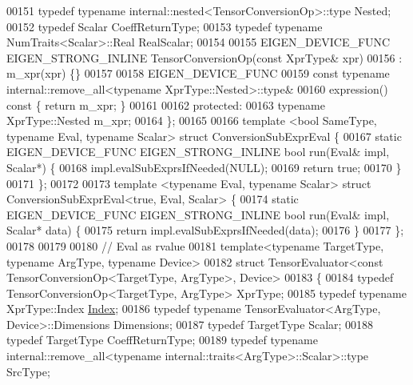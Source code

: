 \begin{DoxyCode}
00151     \textcolor{keyword}{typedef} \textcolor{keyword}{typename} internal::nested<TensorConversionOp>::type Nested;
00152     \textcolor{keyword}{typedef} Scalar CoeffReturnType;
00153     \textcolor{keyword}{typedef} \textcolor{keyword}{typename} NumTraits<Scalar>::Real RealScalar;
00154 
00155     EIGEN\_DEVICE\_FUNC EIGEN\_STRONG\_INLINE TensorConversionOp(\textcolor{keyword}{const} XprType& xpr)
00156         : m\_xpr(xpr) \{\}
00157 
00158     EIGEN\_DEVICE\_FUNC
00159     \textcolor{keyword}{const} \textcolor{keyword}{typename} internal::remove\_all<typename XprType::Nested>::type&
00160     expression()\textcolor{keyword}{ const }\{ \textcolor{keywordflow}{return} m\_xpr; \}
00161 
00162   \textcolor{keyword}{protected}:
00163     \textcolor{keyword}{typename} XprType::Nested m\_xpr;
00164 \};
00165 
00166 \textcolor{keyword}{template} <\textcolor{keywordtype}{bool} SameType, \textcolor{keyword}{typename} Eval, \textcolor{keyword}{typename} Scalar> \textcolor{keyword}{struct }ConversionSubExprEval \{
00167   \textcolor{keyword}{static} EIGEN\_DEVICE\_FUNC EIGEN\_STRONG\_INLINE \textcolor{keywordtype}{bool} run(Eval& impl, Scalar*) \{
00168     impl.evalSubExprsIfNeeded(NULL);
00169     \textcolor{keywordflow}{return} \textcolor{keyword}{true};
00170   \}
00171 \};
00172 
00173 \textcolor{keyword}{template} <\textcolor{keyword}{typename} Eval, \textcolor{keyword}{typename} Scalar> \textcolor{keyword}{struct }ConversionSubExprEval<true, Eval, Scalar> \{
00174   \textcolor{keyword}{static} EIGEN\_DEVICE\_FUNC EIGEN\_STRONG\_INLINE \textcolor{keywordtype}{bool} run(Eval& impl, Scalar* data) \{
00175     \textcolor{keywordflow}{return} impl.evalSubExprsIfNeeded(data);
00176   \}
00177 \};
00178 
00179 
00180 \textcolor{comment}{// Eval as rvalue}
00181 \textcolor{keyword}{template}<\textcolor{keyword}{typename} TargetType, \textcolor{keyword}{typename} ArgType, \textcolor{keyword}{typename} Device>
00182 \textcolor{keyword}{struct }TensorEvaluator<const TensorConversionOp<TargetType, ArgType>, Device>
00183 \{
00184   \textcolor{keyword}{typedef} TensorConversionOp<TargetType, ArgType> XprType;
00185   \textcolor{keyword}{typedef} \textcolor{keyword}{typename} XprType::Index \hyperlink{namespace_eigen_a62e77e0933482dafde8fe197d9a2cfde}{Index};
00186   \textcolor{keyword}{typedef} \textcolor{keyword}{typename} TensorEvaluator<ArgType, Device>::Dimensions Dimensions;
00187   \textcolor{keyword}{typedef} TargetType Scalar;
00188   \textcolor{keyword}{typedef} TargetType CoeffReturnType;
00189   \textcolor{keyword}{typedef} \textcolor{keyword}{typename} internal::remove\_all<typename internal::traits<ArgType>::Scalar>::type SrcType;

\end{DoxyCode}
